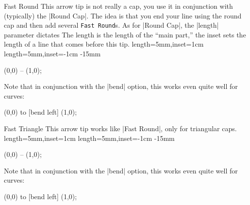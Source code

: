 \begin{arrowcap}{Fast Round}
  {
    This arrow tip is not really a cap, you use it in conjunction with
    (typically) the |Round Cap|. The idea is that you end your line
    using the round cap and then add several \texttt{Fast
      Round}s. As for |Round Cap|, the |length| parameter
    dictates  The length is the length of the ``main part,'' the
    inset sets the length of a line that comes before this tip.
  }
  {length=5mm,inset=1cm}
  {length=5mm,inset=-1cm}
  {-15mm}
  
\begin{codeexample}[]
\tikz \draw [line width=1ex,
             -{Round Cap []. Fast Round[] Fast Round[]}]
  (0,0) -- (1,0);             
\end{codeexample}
  Note that in conjunction with the |bend| option, this works even
  quite well for curves:
\begin{codeexample}[]
\tikz [f/.tip = Fast Round] %
  \draw [line width=1ex, -{[bend] Round Cap[] . f f f}]
  (0,0) to [bend left] (1,0);             
\end{codeexample}
  
  \begin{arrowcapexamples}
    \arrowcapexample[]
    \arrowcapexample[reversed]
    \arrowcapexample[cap angle=60]
    \arrowcapexample[cap angle=60,inset=5pt]
    \arrowcapexample[length=.5ex]
    \arrowcapexample[slant=.3]
  \end{arrowcapexamples}
\end{arrowcap}


\begin{arrowcap}{Fast Triangle}
  {
    This arrow tip works like |Fast Round|, only for triangular caps. 
  }
  {length=5mm,inset=1cm}
  {length=5mm,inset=-1cm}
  {-15mm}
  
\begin{codeexample}[]
\tikz \draw [line width=1ex,
             -{Triangle Cap []. Fast Triangle[] Fast Triangle[]}]
  (0,0) -- (1,0);             
\end{codeexample}
  Note that in conjunction with the |bend| option, this works even
  quite well for curves:
\begin{codeexample}[]
\tikz [f/.tip = Fast Triangle] %
  \draw [line width=1ex, -{[bend] Triangle Cap[] . f f f}]
  (0,0) to [bend left] (1,0);             
\end{codeexample}
  
  \begin{arrowcapexamples}
    \arrowcapexample[]
    \arrowcapexample[reversed]
    \arrowcapexample[cap angle=60]
    \arrowcapexample[cap angle=60,inset=5pt]
    \arrowcapexample[length=.5ex]
    \arrowcapexample[slant=.3]
  \end{arrowcapexamples}
\end{arrowcap}



